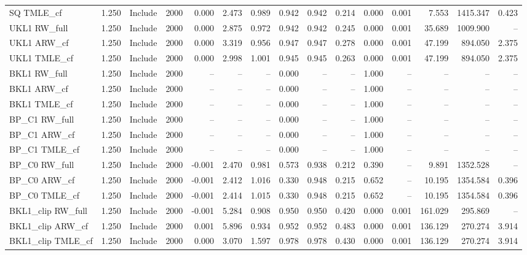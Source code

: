 \begin{tabular}{llllrrrrrrrrrrr}
SQ TMLE\_cf & 1.250 & Include & 2000 & 0.000 & 2.473 & 0.989 & 0.942 & 0.942 & 0.214 & 0.000 & 0.001 & 7.553 & 1415.347 & 0.423 \\
UKL1 RW\_full & 1.250 & Include & 2000 & 0.000 & 2.875 & 0.972 & 0.942 & 0.942 & 0.245 & 0.000 & 0.001 & 35.689 & 1009.900 & -- \\
UKL1 ARW\_cf & 1.250 & Include & 2000 & 0.000 & 3.319 & 0.956 & 0.947 & 0.947 & 0.278 & 0.000 & 0.001 & 47.199 & 894.050 & 2.375 \\
UKL1 TMLE\_cf & 1.250 & Include & 2000 & 0.000 & 2.998 & 1.001 & 0.945 & 0.945 & 0.263 & 0.000 & 0.001 & 47.199 & 894.050 & 2.375 \\
BKL1 RW\_full & 1.250 & Include & 2000 & -- & -- & -- & 0.000 & -- & -- & 1.000 & -- & -- & -- & -- \\
BKL1 ARW\_cf & 1.250 & Include & 2000 & -- & -- & -- & 0.000 & -- & -- & 1.000 & -- & -- & -- & -- \\
BKL1 TMLE\_cf & 1.250 & Include & 2000 & -- & -- & -- & 0.000 & -- & -- & 1.000 & -- & -- & -- & -- \\
BP\_C1 RW\_full & 1.250 & Include & 2000 & -- & -- & -- & 0.000 & -- & -- & 1.000 & -- & -- & -- & -- \\
BP\_C1 ARW\_cf & 1.250 & Include & 2000 & -- & -- & -- & 0.000 & -- & -- & 1.000 & -- & -- & -- & -- \\
BP\_C1 TMLE\_cf & 1.250 & Include & 2000 & -- & -- & -- & 0.000 & -- & -- & 1.000 & -- & -- & -- & -- \\
BP\_C0 RW\_full & 1.250 & Include & 2000 & -0.001 & 2.470 & 0.981 & 0.573 & 0.938 & 0.212 & 0.390 & -- & 9.891 & 1352.528 & -- \\
BP\_C0 ARW\_cf & 1.250 & Include & 2000 & -0.001 & 2.412 & 1.016 & 0.330 & 0.948 & 0.215 & 0.652 & -- & 10.195 & 1354.584 & 0.396 \\
BP\_C0 TMLE\_cf & 1.250 & Include & 2000 & -0.001 & 2.414 & 1.015 & 0.330 & 0.948 & 0.215 & 0.652 & -- & 10.195 & 1354.584 & 0.396 \\
BKL1\_clip RW\_full & 1.250 & Include & 2000 & -0.001 & 5.284 & 0.908 & 0.950 & 0.950 & 0.420 & 0.000 & 0.001 & 161.029 & 295.869 & -- \\
BKL1\_clip ARW\_cf & 1.250 & Include & 2000 & 0.001 & 5.896 & 0.934 & 0.952 & 0.952 & 0.483 & 0.000 & 0.001 & 136.129 & 270.274 & 3.914 \\
BKL1\_clip TMLE\_cf & 1.250 & Include & 2000 & 0.000 & 3.070 & 1.597 & 0.978 & 0.978 & 0.430 & 0.000 & 0.001 & 136.129 & 270.274 & 3.914 \\

\end{tabular}
